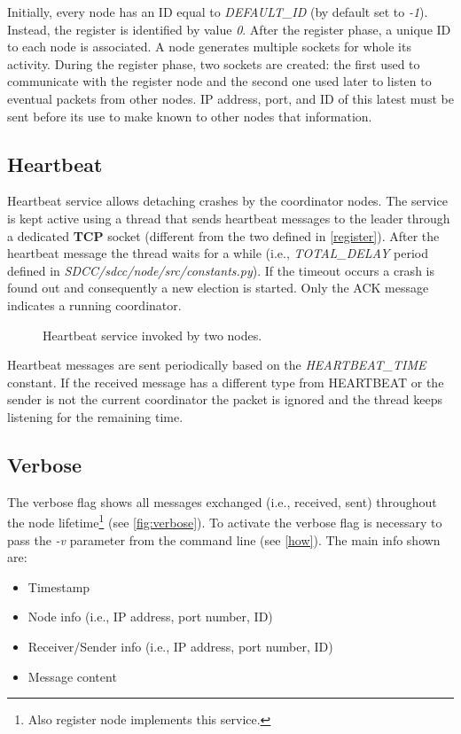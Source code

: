 \documentclass[conference]{IEEEtran}
\begin{document}
Initially, every node has an ID equal to \textit{DEFAULT\_ID} (by default set to \textit{-1}). Instead, the register is identified by value \textit{0}. After the register phase, a unique ID to each node is associated.
A node generates multiple sockets for whole its activity. During the register phase, two sockets are created: the first used to communicate with the register node and the second one used later to listen to eventual packets from other nodes. IP address, port, and ID of this latest must be sent before its use to make known to other nodes that information.

\subsection{Heartbeat}

Heartbeat service allows detaching crashes by the coordinator nodes. The service is kept active using a thread that sends heartbeat messages to the leader through a dedicated \textbf{TCP} socket (different from the two defined in \ref{register}). After the heartbeat message the thread waits for a while (i.e., \textit{TOTAL\_DELAY} period defined in \textit{SDCC/sdcc/node/src/constants.py}). If the timeout occurs a crash is found out and consequently a new election is started. Only the ACK message indicates a running coordinator.   

\begin{figure}[htbp]
  \centering
  
  \caption{Heartbeat service invoked by two nodes.}
\end{figure}

Heartbeat messages are sent periodically based on the \textit{HEARTBEAT\_TIME} constant. 
If the received message has a different type from HEARTBEAT or the sender is not the current coordinator the packet is ignored and the thread keeps listening for the remaining time. 

\subsection{Verbose}

The verbose flag shows all messages exchanged (i.e., received, sent) throughout the node lifetime\footnote{Also register node implements this service.} (see \ref{fig:verbose}). 
To activate the verbose flag is necessary to pass the \textit{-v} parameter from the command line (see \ref{how}). 
The main info shown are:
\begin{itemize}
    \item Timestamp
    \item Node info (i.e., IP address, port number, ID)
    \item Receiver/Sender info (i.e., IP address, port number, ID)
    \item Message content
\end{itemize}
\end{document}

